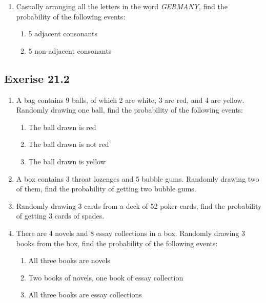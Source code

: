 \documentclass{report}
\begin{document}
\begin{multicols}{2}
\begin{enumerate}
    \item Casually arranging all the letters in the word \textit{GERMANY}, find the
          probability of the following events:
          \begin{enumerate}
            \item 5 adjacent consonants
            \item 5 non-adjacent consonants
          \end{enumerate}
  \end{enumerate}

  \subsection{Exerise 21.2}

  \begin{enumerate}
    \item A bag contains 9 balls, of which 2 are white, 3 are red, and 4 are yellow.
          Randomly drawing one ball, find the probability of the following events:
          \begin{enumerate}
            \item The ball drawn is red
            \item The ball drawn is not red
            \item The ball drawn is yellow
          \end{enumerate}

    \item A box contains 3 throat lozenges and 5 bubble gums. Randomly drawing two of
          them, find the probability of getting two bubble gums.

    \item Randomly drawing 3 cards from a deck of 52 poker cards, find the probability of
          getting 3 cards of spades.

    \item There are 4 novels and 8 essay collections in a box. Randomly drawing 3 books
          from the box, find the probability of the following events:

          \begin{enumerate}
            \item All three books are novels
            \item Two books of novels, one book of essay collection
            \item All three books are essay collections
          \end{enumerate}


\end{enumerate}
\end{multicols}
\end{document}
